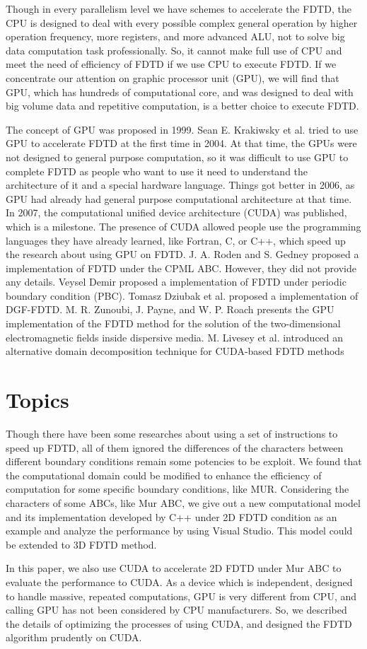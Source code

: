 Though in every parallelism level we have schemes to accelerate the FDTD, the CPU is designed to deal with every possible complex general operation by higher operation frequency, more registers, and more advanced ALU, not to solve big data computation task professionally. So, it cannot make full use of CPU and meet the need of efficiency of FDTD if we use CPU to execute FDTD. If we concentrate our attention on graphic processor unit (GPU), we will find that GPU, which has hundreds of computational core, and was designed to deal with big volume data and repetitive computation, is a better choice to execute FDTD.

The concept of GPU was proposed in 1999. Sean E. Krakiwsky et al.\cite{Krakiwsky} tried to use GPU to accelerate FDTD at the first time in 2004. At that time, the GPUs were not designed to general purpose computation, so it was difficult to use GPU to complete FDTD as people who want to use it need to understand the architecture of it and a special hardware language. Things got better in 2006, as GPU had already had general purpose computational architecture at that time. In 2007, the computational unified device architecture (CUDA) was published, which is a milestone. The presence of CUDA allowed people use the programming languages they have already learned, like Fortran, C, or C++, which speed up the research about using GPU on FDTD. J. A. Roden and S. Gedney\cite{Roden} proposed a implementation of FDTD under the CPML ABC. However, they did not provide any details. Veysel Demir \cite{Demir} proposed a implementation of FDTD under periodic boundary condition (PBC). Tomasz Dziubak et al.\cite{dgffdtd} proposed a implementation of DGF-FDTD. M. R. Zunoubi, J. Payne, and W. P. Roach\cite{tez} presents the GPU implementation of the FDTD method for the solution of the two-dimensional electromagnetic fields inside dispersive media. M. Livesey et al.\cite{decomposition} introduced an alternative domain decomposition technique for CUDA-based FDTD methods

\section{Topics}

Though there have been some researches about using a set of instructions to speed up FDTD, all of them ignored the differences of the characters between different boundary conditions remain some potencies to be exploit. We found that the computational domain could be modified to enhance the efficiency of computation for some specific boundary conditions, like MUR. Considering the characters of some ABCs, like Mur ABC, we give out a new computational model and its implementation developed by C++ under 2D FDTD condition as an example and analyze the performance by using Visual Studio. This model could be extended to 3D FDTD method.

 In this paper, we also use CUDA to accelerate 2D FDTD under Mur ABC to evaluate the performance to CUDA. As a device which is  independent, designed to handle massive, repeated computations, GPU is very different from CPU, and calling GPU has not been considered by CPU manufacturers. So, we described the details of optimizing the processes of using CUDA, and designed the FDTD algorithm prudently on CUDA.

